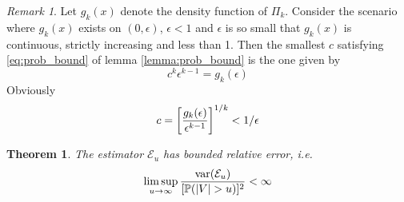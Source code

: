 \documentclass{article}
\newtheorem{theorem}{Theorem}
\theoremstyle{remark}
\newtheorem{remark}{Remark}
\begin{document}
\begin{remark}\label{remark:inf_c}
  Let $g_k(x)$ denote the density function of $\Pi_k$. Consider the
  scenario where $g_k(x)$ exists on $(0, \epsilon)$, $\epsilon < 1$
  and $\epsilon$ is so small that $g_k(x)$ is continuous, strictly
  increasing and less than 1. Then the smallest $c$ satisfying
  \eqref{eq:prob_bound} of lemma \ref{lemma:prob_bound} is the one
  given by
  \[
  c^k \epsilon^{k-1} = g_k(\epsilon)
  \]
  Obviously
  \[
  c = \left[
    {g_k(\epsilon) \over \epsilon^{k-1}}
  \right]^{1/k} < 1/\epsilon
  \]
\end{remark}

\begin{theorem}
  The estimator $\mathcal E_u$ has bounded relative error, i.e.
  \begin{equation*}
    \limsup_{u \to \infty} {\text{var}(\mathcal E_u) \over [\mathbb{P}(|V| > u)]^2} < \infty
  \end{equation*}
\end{theorem}
\end{document}
